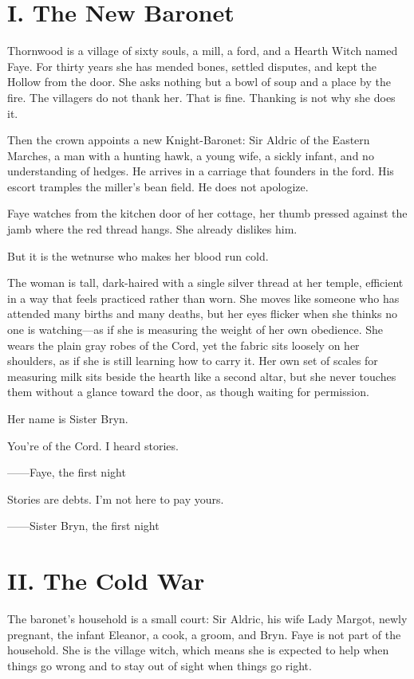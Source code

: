 \documentclass[11pt]{book}
\begin{document}
\section*{I. The New Baronet}
Thornwood is a village of sixty souls, a mill, a ford, and a Hearth Witch named Faye. For thirty years she has mended bones, settled disputes, and kept the Hollow from the door. She asks nothing but a bowl of soup and a place by the fire. The villagers do not thank her. That is fine. Thanking is not why she does it.

Then the crown appoints a new Knight-Baronet: Sir Aldric of the Eastern Marches, a man with a hunting hawk, a young wife, a sickly infant, and no understanding of hedges. He arrives in a carriage that founders in the ford. His escort tramples the miller's bean field. He does not apologize.

Faye watches from the kitchen door of her cottage, her thumb pressed against the jamb where the red thread hangs. She already dislikes him.

But it is the wetnurse who makes her blood run cold.

The woman is tall, dark-haired with a single silver thread at her temple, efficient in a way that feels practiced rather than worn. She moves like someone who has attended many births and many deaths, but her eyes flicker when she thinks no one is watching---as if she is measuring the weight of her own obedience. She wears the plain gray robes of the Cord, yet the fabric sits loosely on her shoulders, as if she is still learning how to carry it. Her own set of scales for measuring milk sits beside the hearth like a second altar, but she never touches them without a glance toward the door, as though waiting for permission.

Her name is Sister Bryn.

\epigraph{You're of the Cord. I heard stories.}{------Faye, the first night}
\epigraph{Stories are debts. I'm not here to pay yours.}{------Sister Bryn, the first night}

\section*{II. The Cold War}
The baronet's household is a small court: Sir Aldric, his wife Lady Margot, newly pregnant, the infant Eleanor, a cook, a groom, and Bryn. Faye is not part of the household. She is the village witch, which means she is expected to help when things go wrong and to stay out of sight when things go right.
\end{document}
